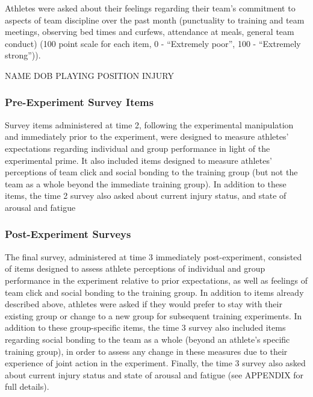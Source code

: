 Athletes were asked about their feelings regarding their team's commitment to aspects of team discipline over the past month (punctuality to training and team meetings, observing bed times and curfews, attendance at meals, general team conduct) (100 point scale for each item, 0 - ``Extremely poor'', 100 - ``Extremely strong'')).

NAME
DOB
PLAYING POSITION
INJURY



\subsubsection{\label{app6:surveyItemsPre}Pre-Experiment Survey Items}
Survey items administered at time 2, following the experimental manipulation and immediately prior to the experiment, were designed to measure athletes' expectations regarding individual and group performance in light of the experimental prime. It also included items designed to measure athletes' perceptions of team click and social bonding to the training group (but not the team as a whole beyond the immediate training group).
In addition to these items, the time 2 survey also asked about current injury status, and state of arousal and fatigue








\subsubsection{\label{app6:surveyItemsPost}Post-Experiment Surveys}
The final survey, administered at time 3 immediately post-experiment, consisted of items designed to assess athlete perceptions of individual and group performance in the experiment relative to prior expectations, as well as feelings of team click and social bonding to the training group. In addition to items already described above, athletes were asked if they would prefer to stay with their existing group or change to a new group for subsequent training experiments.  In addition to these group-specific items, the time 3 survey also included items regarding social bonding to the team as a whole (beyond an athlete's specific training group), in order to assess any change in these measures due to their experience of joint action in the experiment.  Finally, the time 3 survey also asked about current injury status and state of arousal and fatigue (see APPENDIX for full details).



